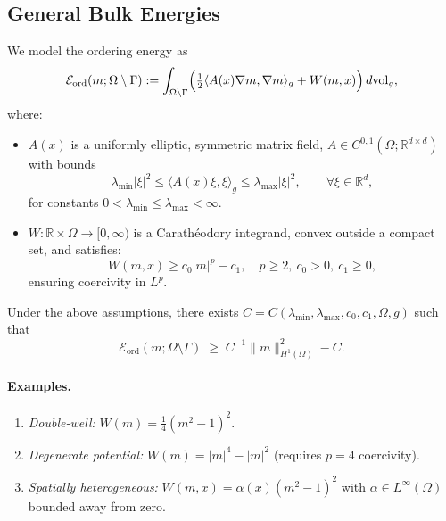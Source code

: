 \subsection{General Bulk Energies}
We model the ordering energy as
\begin{equation}\label{eq:Eord-general}
  \mathcal{E}_{\mathrm{ord}}(m;\Omega\setminus\Gamma)
    := \int_{\Omega\setminus\Gamma} \Bigl( \tfrac{1}{2}\langle A(x)\nabla m,\nabla m\rangle_g + W(m,x) \Bigr)\, d\mathrm{vol}_g,
\end{equation}
where:
\begin{itemize}
  \item $A(x)$ is a uniformly elliptic, symmetric matrix field, $A\in C^{0,1}(\Omega;\mathbb{R}^{d\times d})$ with bounds
  \[
    \lambda_{\min}|\xi|^2 \le \langle A(x)\xi,\xi\rangle_g \le \lambda_{\max}|\xi|^2,\qquad \forall \xi\in\mathbb{R}^d,
  \]
  for constants $0<\lambda_{\min}\le \lambda_{\max}<\infty$.
  \item $W:\mathbb{R}\times\Omega\to [0,\infty)$ is a Carathéodory integrand, convex outside a compact set, and satisfies:
  \[
    W(m,x) \ge c_0|m|^p - c_1, \quad p\ge 2,\ c_0>0,\ c_1\ge 0,
  \]
  ensuring coercivity in $L^p$.
\end{itemize}

\begin{proposition}\label{prop:coercivity-general}
Under the above assumptions, there exists $C=C(\lambda_{\min},\lambda_{\max},c_0,c_1,\Omega,g)$ such that
\[
  \mathcal{E}_{\mathrm{ord}}(m;\Omega\setminus\Gamma) \;\ge\; C^{-1}\|m\|_{H^1(\Omega)}^2 - C.
\]
\end{proposition}

\paragraph{Examples.}
\begin{enumerate}
  \item \emph{Double-well:} $W(m)=\tfrac{1}{4}(m^2-1)^2$.
  \item \emph{Degenerate potential:} $W(m)=|m|^4 - |m|^2$ (requires $p=4$ coercivity).
  \item \emph{Spatially heterogeneous:} $W(m,x)=\alpha(x)(m^2-1)^2$ with $\alpha\in L^\infty(\Omega)$ bounded away from zero.
\end{enumerate}

